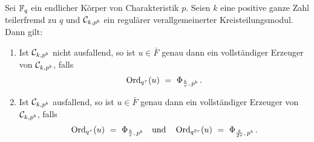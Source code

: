 \begin{satz}
  \label{satz:regulare_erweiterungen}
  Sei $\mathbb{F}_q$ ein endlicher Körper von Charakteristik $p$. 
  Seien $k$ eine positive ganze Zahl teilerfremd zu $q$ und 
  $\mathcal{C}_{k,p^b}$ ein regulärer verallgemeinerter Kreisteilungsmodul. Dann gilt:
  \begin{enumerate}
    \item Ist $\mathcal{C}_{k,p^b}$ nicht ausfallend, so ist $u \in \bar F$ genau dann
      ein vollständiger Erzeuger von $\mathcal{C}_{k,p^b}$, falls
      \[ \operatorname{Ord}_{q^\tau}(u) \ =\  \Phi_{\frac k \tau,\, p^b} \,.\]
    \item Ist $\mathcal{C}_{k,p^b}$ ausfallend, so ist $u\in \bar F$ genau dann
      ein vollständiger Erzeuger von $\mathcal{C}_{k,p^b}$, falls
      \[ \operatorname{Ord}_{q^\tau}(u) \ =\  \Phi_{\frac k \tau,\, p^b} \quad
        \text{und}\quad 
        \operatorname{Ord}_{q^{2\tau}}(u) \ =\  \Phi_{\frac{k}{2\tau},\, p^b}\,.\]
  \end{enumerate}
\end{satz}
